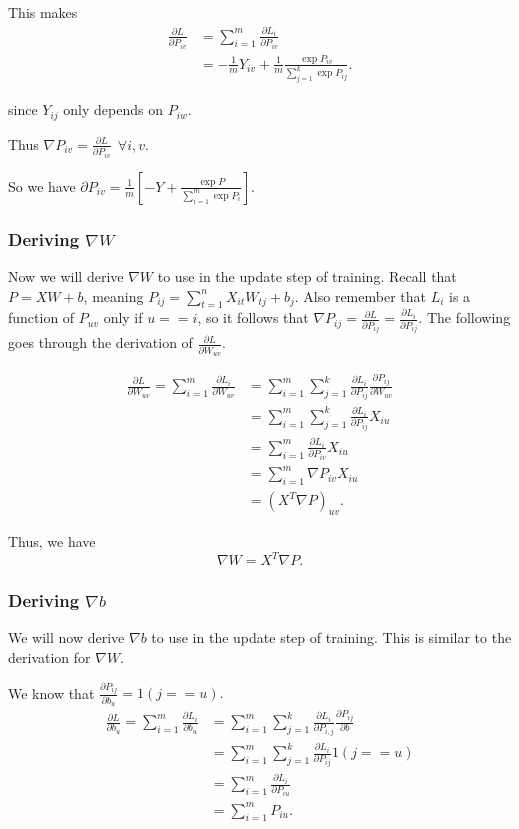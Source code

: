 This makes
\begin{align*}
  \frac{\partial L}{\partial P_{iv}}
  &= \sum_{i=1}^m \frac{\partial L_i}{\partial P_{iv}}\\
  &= -\frac{1}{m} Y_{iv} + \frac{1}{m}
  \frac{\exp{P_{iv}}}{\sum_{j=1}^k \exp{P_{ij}}}.
\end{align*}
  
since $Y_{ij}$ only depends on $P_{iw}$.

Thus $\nabla P_{iv} = \frac{\partial L}{\partial P_{iv}} ~~\forall i,v.$

So we have $\partial P_{iv} = \frac{1}{m} \left[ -Y +
\frac{\exp{P}}{\sum_{i=1}^m \exp{P_i}} \right]$.

\subsubsection{Deriving $\nabla W$}
Now we will derive $\nabla W$ to use in the update step of training. Recall
that $P = XW + b$, meaning $P_{ij} = \sum_{t=1}^n X_{it}W_{tj} + b_j $.
Also remember that $L_i$ is a function of $P_{uv}$ only if $u == i$, so it
follows that $\nabla P_{ij} = \frac{\partial L}{\partial P_{ij}} =
\frac{\partial L_i}{\partial P_{ij}}$. The following goes through the
derivation of $\frac{\partial L}{\partial W_{uv}}$.

\begin{align*} 
     \frac{\partial L}{\partial W_{uv}} = 
     \sum_{i=1}^m \frac{\partial L_i}{\partial W_{uv}} &= 
     \sum_{i=1}^m \sum_{j=1}^k \frac{\partial L_i}{\partial P_{ij}}
       \frac{\partial P_{ij}}{\partial W_{uv}}\\
     &= \sum_{i=1}^m \sum_{j=1}^k
         \frac{\partial L_i}{\partial P_{ij}} X_{iu}\\
     &= \sum_{i=1}^m \frac{\partial L_i}{\partial P_{iv}} X_{iu}\\
     &= \sum_{i=1}^m \nabla P_{iv} X_{iu}\\
     &= \left( X^T \nabla P \right)_{uv}.
\end{align*}

Thus, we have
$$ \nabla W = X^T \nabla P. $$

\subsubsection{Deriving $\nabla b$}
We will now derive $\nabla b$ to use in the update step of training. This is
similar to the derivation for $\nabla W$.

We know that $\frac{\partial P_{ij}}{\partial b_u} = 1(j == u).$
\begin{align*} 
  \frac{\partial L}{\partial b_u} = 
  \sum_{i=1}^m \frac{\partial L_i}{\partial b_u} &= 
  \sum_{i=1}^m \sum_{j=1}^k \frac{\partial L_i}{\partial P_{i, j}}
  \frac{\partial P_{ij}}{\partial b}\\
  &= \sum_{i=1}^m \sum_{j=1}^k \frac{\partial L_i}{\partial P_{ij}} 1(j == u)\\
  &= \sum_{i=1}^m \frac{\partial L_i}{\partial P_{iu}} \\
  &= \sum_{i=1}^m P_{iu}.
\end{align*}

